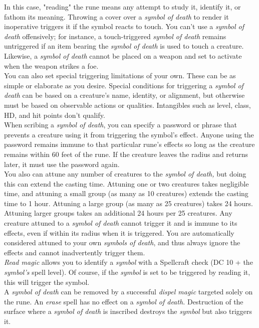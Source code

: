In this case, "reading" the rune means any attempt to study it, identify it, or fathom its meaning. Throwing a cover over a \textit{symbol of death }to render it inoperative triggers it if the symbol reacts to touch. You can't use a \textit{symbol of death }offensively; for instance, a touch-triggered \textit{symbol of death} remains untriggered if an item bearing the \textit{symbol of death }is used to touch a creature. Likewise, a \textit{symbol of death }cannot be placed on a weapon and set to activate when the weapon strikes a foe.\\
You can also set special triggering limitations of your own. These can be as simple or elaborate as you desire. Special conditions for triggering a \textit{symbol of death }can be based on a creature's name, identity, or alignment, but otherwise must be based on observable actions or qualities. Intangibles such as level, class, HD, and hit points don't qualify. \\
When scribing a \textit{symbol of death}, you can specify a password or phrase that prevents a creature using it from triggering the symbol's effect\textit{. }Anyone using the password remains immune to that particular rune's effects so long as the creature remains within 60 feet of the rune. If the creature leaves the radius and returns later, it must use the password again.\\
You also can attune any number of creatures to the \textit{symbol of death, }but doing this can extend the casting time. Attuning one or two creatures takes negligible time, and attuning a small group (as many as 10 creatures) extends the casting time to 1 hour. Attuning a large group (as many as 25 creatures) takes 24 hours. Attuning larger groups takes an additional 24 hours per 25 creatures. Any creature attuned to a \textit{symbol of death }cannot trigger it and is immune to its effects, even if within its radius when it is triggered. You are automatically considered attuned to your own \textit{symbols of death}, and thus always ignore the effects and cannot inadvertently trigger them.\\
\textit{Read magic }allows you to identify a \textit{symbol }with a Spellcraft check (DC 10 + the \textit{symbol's }spell level). Of course, if the \textit{symbol }is set to be triggered by reading it, this will trigger the symbol.\\
A \textit{symbol of death }can be removed by a successful \textit{dispel magic }targeted solely on the rune. An \textit{erase }spell has no effect on a \textit{symbol of death. }Destruction of the surface where a \textit{symbol of death }is inscribed destroys the \textit{symbol }but also triggers it.\\
